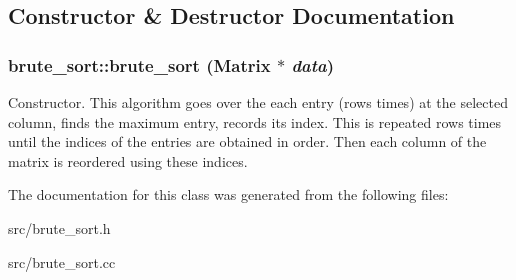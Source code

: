 \subsection{Constructor \& Destructor Documentation}
\hypertarget{classbrute__sort_a2dbbb3b1c89d6a5720d79a5bf150ad1f}{
\subsubsection[{brute\_\-sort}]{\setlength{\rightskip}{0pt plus 5cm}brute\_\-sort::brute\_\-sort ({\bf Matrix} $\ast$ {\em data})}}
\label{d3/d39/classbrute__sort_a2dbbb3b1c89d6a5720d79a5bf150ad1f}


Constructor. This algorithm goes over the each entry (rows times) at the selected column, finds the maximum entry, records its index. This is repeated rows times until the indices of the entries are obtained in order. Then each column of the matrix is reordered using these indices. 

The documentation for this class was generated from the following files:\begin{DoxyCompactItemize}
\item 
src/brute\_\-sort.h\item 
src/brute\_\-sort.cc\end{DoxyCompactItemize}
